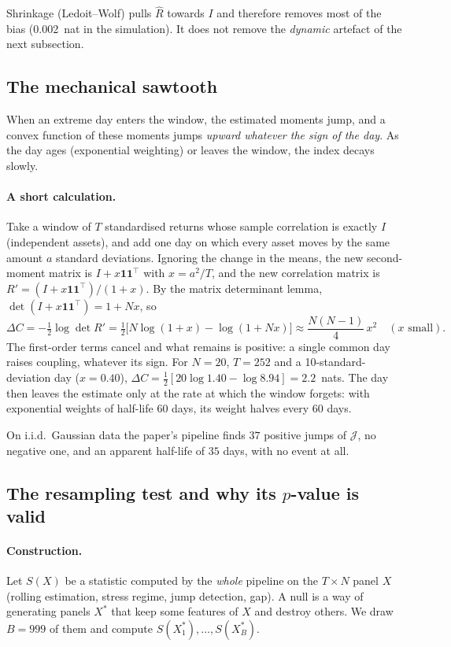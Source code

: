 \documentclass[11pt]{article}
\theoremstyle{plain}
\theoremstyle{definition}
\theoremstyle{remark}
\newcommand{\JJ}{\mathcal{J}}
\newcommand{\BIASTWENTYLW}{0.002}
\begin{document}
\begin{piege}
Shrinkage (Ledoit--Wolf) pulls $\hat R$ towards $I$ and therefore removes most
of the bias (\BIASTWENTYLW~nat in the simulation). It does not remove the
\emph{dynamic} artefact of the next subsection.
\end{piege}

\subsection{The mechanical sawtooth}

When an extreme day enters the window, the estimated moments jump, and a
convex function of these moments jumps \emph{upward whatever the sign of the
day}. As the day ages (exponential weighting) or leaves the window, the index
decays slowly.

\paragraph{A short calculation.} Take a window of $T$ standardised returns
whose sample correlation is exactly $I$ (independent assets), and add one day
on which every asset moves by the same amount $a$ standard deviations. Ignoring
the change in the means, the new second-moment matrix is $I+x\mathbf 1\mathbf
1^\top$ with $x=a^2/T$, and the new correlation matrix is
$R'=(I+x\mathbf 1\mathbf 1^\top)/(1+x)$. By the matrix determinant lemma,
$\det(I+x\mathbf 1\mathbf 1^\top)=1+Nx$, so
\[
\Delta C=-\tfrac12\log\det R'=\tfrac12\bigl[N\log(1+x)-\log(1+Nx)\bigr]
\approx\frac{N(N-1)}{4}\,x^2\quad(x\text{ small}).
\]
The first-order terms cancel and what remains is positive: a single common day
raises coupling, whatever its sign. For $N=20$, $T=252$ and a 10-standard-deviation
day ($x=0.40$), $\Delta C=\tfrac12[20\log1.40-\log8.94]=2.2$~nats. The day then
leaves the estimate only at the rate at which the window forgets: with
exponential weights of half-life 60 days, its weight halves every 60 days.

On i.i.d.\ Gaussian data the paper's pipeline finds $37$ positive jumps of
$\JJ$, no negative one, and an apparent half-life of $35$ days, with no event
at all.

\subsection{The resampling test and why its $p$-value is valid}

\paragraph{Construction.} Let $S(X)$ be a statistic computed by the
\emph{whole} pipeline on the $T\times N$ panel $X$ (rolling estimation, stress
regime, jump detection, gap). A null is a way of generating panels $X^*$ that
keep some features of $X$ and destroy others. We draw $B=999$ of them and
compute $S(X^*_1),\dots,S(X^*_B)$.
\end{document}
